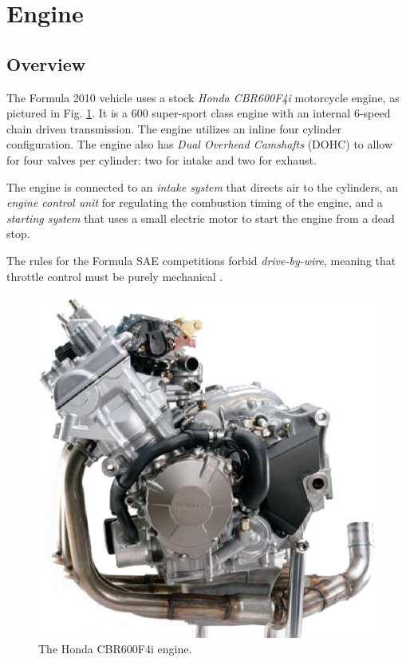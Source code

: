 \section{Engine}

\subsection{Overview}


The Formula 2010 vehicle uses a stock \emph{Honda CBR600F4i} motorcycle engine, as pictured in Fig. \ref{fig:cbr600f4i_engine}. It is a \unit{600}{\centi\cubic\metre} super-sport class engine with an internal 6-speed chain driven transmission. The engine utilizes an inline four cylinder configuration. The engine also has \emph{Dual Overhead Camshafts} (DOHC) to allow for four valves per cylinder: two for intake and two for exhaust.

The engine is connected to an \emph{intake system} that directs air to the cylinders, an \emph{engine control unit} for regulating the combustion timing of the engine, and a \emph{starting system} that uses a small electric motor to start the engine from a dead stop. 

The rules for the Formula SAE competitions forbid \emph{drive-by-wire}, meaning that throttle control must be purely mechanical \cite{2010fsaerules}.

\begin{figure}[H]
	\centering
	 	\includegraphics[scale=0.5]{background/figures/cbr600f4i_engine.eps}
    \caption{The Honda CBR600F4i engine.}
    \label{fig:cbr600f4i_engine}
\end{figure}

